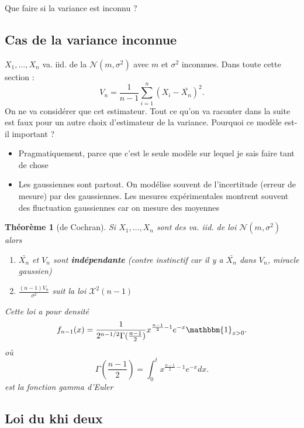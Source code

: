 \documentclass{article}
\theoremstyle{plain}%
\newtheorem{thm}{Théorème}[section]
\theoremstyle{definition}
\theoremstyle{remark}
\begin{document}
Que faire si la variance est inconnu ? 

\subsection{Cas de la variance inconnue}

$ X_1, \dots, X_n $ va. iid. de la $ \mathcal{N}(m, \sigma ^2) $ avec $ m $ et $ \sigma ^2 $ inconnues. Dans toute cette section : 
\[
    V_n = \frac{1}{n-1}\sum_{i=1}^{n}(X_i - \bar{X_n})^2
.\]
On ne va considérer que cet estimateur. Tout ce qu'on va raconter dans la suite est faux pour un autre choix d'estimateur de la variance. Pourquoi ce modèle est-il important ? \begin{itemize}
    \item Pragmatiquement, parce que c'est le seule modèle sur lequel je sais faire tant de chose 
    \item Les gaussiennes sont partout. On modélise souvent de l'incertitude (erreur de mesure) par des gaussiennes. Les mesures expérimentales montrent souvent des fluctuation gaussiennes car on mesure des moyennes
\end{itemize}

\begin{thm}[de Cochran]
    Si $ X_1, \dots, X_n $ sont des va. iid. de loi $ \mathcal{N}(m, \sigma ^2) $ alors 
    \begin{enumerate}
        \item $ \bar{X_n} $ et $ V_n $ sont \textbf{indépendante} (contre instinctif car il y a $ \bar{X_n} $ dans $ V_n $, miracle gaussien)
        \item $ \frac{(n-1)V_n}{\sigma ^2} $ suit la loi $ \mathcal{X}^2 (n-1) $ 
    \end{enumerate}
    Cette loi a pour densité 
    \[
        f_{n-1} (x) = \frac{1 }{2^{n-1/2} \Gamma (\frac{n-1}{2}) } x^{\frac{n-1}{2} - 1} e^{-x} \mathbbm{1}_{x>0}
    .\]
    où 
    \[
        \Gamma (\frac{n-1}{2}) = \int_{0}^{t} x^{\frac{n-1}{2} - 1} e^{-x} dx
    .\]
    est la fonction gamma d'Euler
\end{thm}


\subsection{Loi du khi deux}
\end{document}
